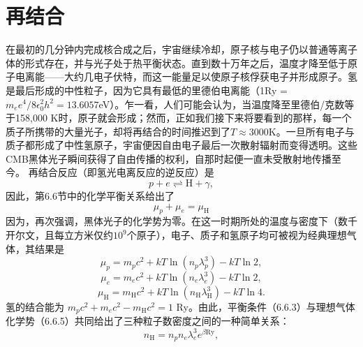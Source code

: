 \section{再结合}\label{ux518dux7ed3ux5408}
在最初的几分钟内完成核合成之后，宇宙继续冷却，原子核与电子仍以普通等离子体的形式存在，并与光子处于热平衡状态。直到数十万年之后，温度才降至低于原子电离能——大约几电子伏特，而这一能量足以使原子核俘获电子并形成原子。氢是最后形成的中性粒子，因为它具有最低的里德伯电离能（1Ry = \(m_{e}e^{4}/8\epsilon_{0}^{2}h^{2} = 13.6057\)eV）。乍一看，人们可能会认为，当温度降至里德伯/克数等于158,000 K时，原子就会形成；然而，正如我们接下来将要看到的那样，每一个质子所携带的大量光子，却将再结合的时间推迟到了\(T \approx 3000\)K。一旦所有电子与质子都形成了中性氢原子，宇宙便因自由电子最后一次散射辐射而变得透明。这些CMB黑体光子瞬间获得了自由传播的权利，自那时起便一直未受散射地传播至今。
再结合反应（即氢光电离反应的逆反应）是
\begin{equation}\tag{9.8.1}\label{eq:9.8.1}
p + e \rightleftharpoons \mathrm { H } + \gamma ,
\end{equation}
因此，第6.6节中的化学平衡关系给出了
\begin{equation}\tag{9.8.2}\label{eq:9.8.2}
\mu _ { p } + \mu _ { e } = \mu _ { \mathrm { H } }
\end{equation}
因为，再次强调，黑体光子的化学势为零。在这一时期所处的温度与密度下（数千开尔文，且每立方米仅约\(10^{9}\)个原子），电子、质子和氢原子均可被视为经典理想气体，其结果是
\begin{equation}\tag{9.8.3}\label{eq:9.8.3}
\mu _ { p } = m _ { p } c ^{2} + k T \ln ( n _ { p } \lambda _ { p } ^{3} ) - k T \ln 2 ,
\end{equation}
\begin{equation}\tag{9.8.4}\label{eq:9.8.4}
\mu _ { e } = m _ { e } c ^{2} + k T \ln ( n _ { e } \lambda _ { e } ^{3} ) - k T \ln 2 ,
\end{equation}
\begin{equation}\tag{9.8.5}\label{eq:9.8.5}
\mu _ { \mathrm { H } } = m _ { \mathrm { H } } c ^{2} + k T \ln ( n _ { \mathrm { H } } \lambda _ { \mathrm { H } } ^{3} ) - k T \ln 4 .
\end{equation}
氢的结合能为 \(m_{p}c^{2} + m_{e}c^{2} - m_{\mathrm{H}}c^{2} = 1\) Ry。由此，平衡条件（6.6.3）与理想气体化学势（6.6.5）共同给出了三种粒子数密度之间的一种简单关系：
\begin{equation}\tag{9.8.6}\label{eq:9.8.6}
n _ { \mathrm { H } } = n _ { p } n _ { e } \lambda _ { e } ^{3} e ^{\beta \mathrm { R y} } ,
\end{equation}
